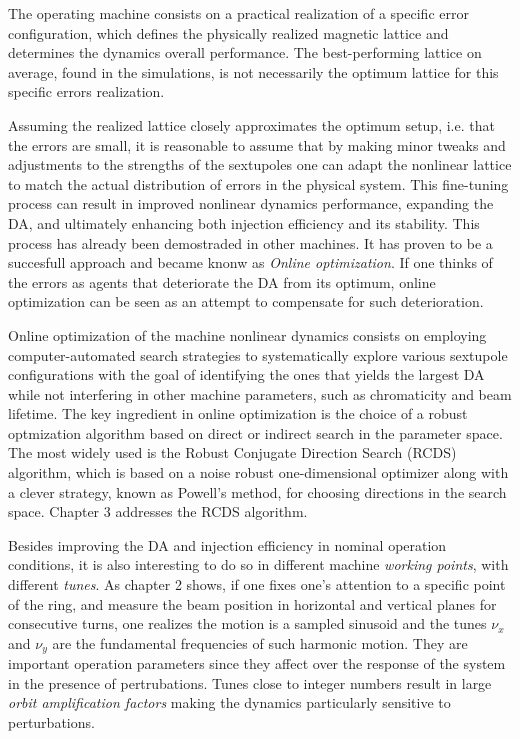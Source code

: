 The operating machine consists on a practical realization of a specific error configuration, which defines the physically realized magnetic lattice and determines the dynamics overall performance. The best-performing lattice on average, found in the simulations, is not necessarily the optimum lattice for this specific errors realization.

Assuming the realized lattice closely approximates the optimum setup, i.e. that the errors are small, it is reasonable to assume that by making minor tweaks and adjustments to the strengths of the sextupoles one can adapt the nonlinear lattice to match the actual distribution of errors in the physical system. This fine-tuning process can result in improved nonlinear dynamics performance, expanding the DA, and ultimately enhancing both injection efficiency and its stability. This process has already been demostraded in other machines. It has proven to be a succesfull approach and became knonw as \textit{Online optimization}. If one thinks of the errors as agents that deteriorate the DA from its optimum, online optimization can be seen as an attempt to compensate for such deterioration.

Online optimization of the machine nonlinear dynamics consists on employing computer-automated search strategies to systematically explore various sextupole configurations with the goal of identifying the ones that yields the largest DA while not interfering in other machine parameters, such as chromaticity and beam lifetime. The key ingredient in online optimization is the choice of a robust optmization algorithm based on direct or indirect search in the parameter space. The most widely used is the Robust Conjugate Direction Search (RCDS) algorithm, which is based on a noise robust one-dimensional optimizer along with a clever strategy, known as Powell's method, for choosing directions in the search space. Chapter 3 addresses the RCDS algorithm.

Besides improving the DA and injection efficiency in nominal operation conditions, it is also interesting to do so in different machine \textit{working points}, with different \textit{tunes}. As chapter 2 shows, if one fixes one's attention to a specific point of the ring, and measure the beam position in horizontal and vertical planes for consecutive turns, one realizes the motion is a sampled sinusoid and the tunes $\nu_x$ and $\nu_y$ are the fundamental frequencies of such harmonic motion. They are important operation parameters  since they affect over the response of the system in the presence of pertrubations. Tunes close to integer numbers result in large \textit{orbit amplification factors} making the dynamics particularly sensitive to perturbations.


